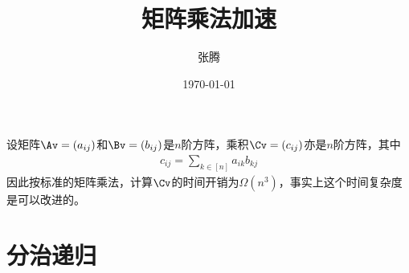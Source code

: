 \documentclass{ctexart}
\begin{document}
\title{\textbf{矩阵乘法加速}}
\author{张腾}
\date{\today}
\maketitle

设矩阵$\Av = (a_{ij})$和$\Bv = (b_{ij})$是$n$阶方阵，乘积$\Cv = (c_{ij})$亦是$n$阶方阵，其中
\begin{align*}
    c_{ij} = \sum_{k \in [n]} a_{ik} b_{kj}
\end{align*}
因此按标准的矩阵乘法，计算$\Cv$的时间开销为$\Omega(n^3)$，事实上这个时间复杂度是可以改进的。

\section{分治递归}
\end{document}
